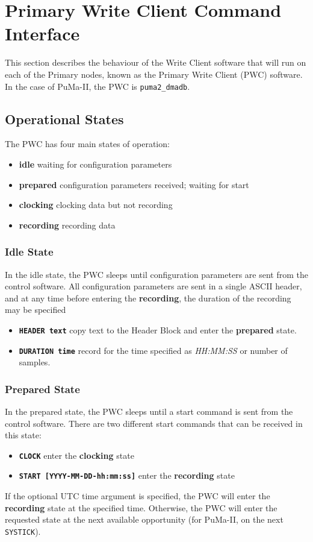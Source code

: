 \section{Primary Write Client Command Interface}
\label{sec:pwc}

This section describes the behaviour of the Write Client software that
will run on each of the Primary nodes, known as the Primary Write
Client (PWC) software.  In the case of PuMa-II, the PWC is 
{\tt puma2\_dmadb}.

\subsection{Operational States}

The PWC has four main states of operation:
\begin{itemize}
\item {\bf idle} waiting for configuration parameters
\item {\bf prepared} configuration parameters received; waiting for start
\item {\bf clocking} clocking data but not recording
\item {\bf recording} recording data
\end{itemize}

\subsubsection{Idle State}

In the idle state, the PWC sleeps until configuration parameters are
sent from the control software.  All configuration parameters are sent
in a single ASCII header, and at any time before entering the {\bf
recording}, the duration of the recording may be specified
\begin{itemize} 
\item {\tt\bf HEADER text} copy text to the Header Block and enter 
the {\bf prepared} state.
\item {\tt\bf DURATION time} record for the time specified as
{\it HH:MM:SS} or number of samples.
\end{itemize}

\subsubsection{Prepared State}

In the prepared state, the PWC sleeps until a start command is sent
from the control software.  There are two different start commands
that can be received in this state:
\begin{itemize}
\item {\tt\bf CLOCK} enter the {\bf clocking} state
\item {\tt\bf START [YYYY-MM-DD-hh:mm:ss]} enter the {\bf recording} state
\end{itemize}
If the optional UTC time argument is specified, the PWC will enter the
{\bf recording} state at the specified time.  Otherwise, the PWC will
enter the requested state at the next available opportunity (for
PuMa-II, on the next {\tt SYSTICK}).

